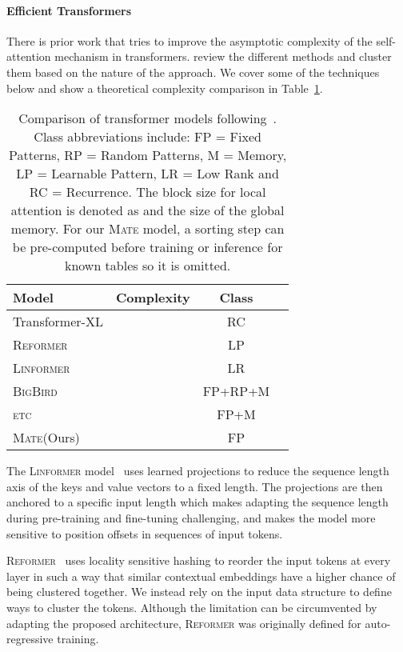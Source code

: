 \documentclass[11pt]{article}
\newcommand{\etc}{\textsc{etc}\xspace}
\newcommand{\bigbird}{\textsc{BigBird}\xspace}
\newcommand{\linformer}{\textsc{Linformer}\xspace}
\newcommand{\reformer}{\textsc{Reformer}\xspace}
\newcommand{\model}{\textsc{Mate}\xspace}
\begin{document}
\paragraph{Efficient Transformers}
There is prior work that tries to improve the asymptotic
complexity of the self-attention mechanism in transformers.
\citet{tay2020efficient} review the different methods and cluster them based
on the nature of the approach. We cover some of the techniques below and show a theoretical complexity comparison in Table~\ref{tab:complexity}.

\begin{table}[t]
    \centering
    \begin{tabular}{lccl}
    \hline
       Model  &  Complexity & Class\\
       \hline
         Transformer-XL
         &  & RC \\ 
        \reformer 
        &  & LP\\
           \linformer 
           &  & LR \\
        \bigbird 
        &  & FP+RP+M\\ 
        \etc 
        &  & FP+M\\ 
        \model (Ours) &  & FP\\ 
        \hline
    \end{tabular}
    \caption{Comparison of transformer models following~\citet{tay2020efficient}. Class abbreviations include: FP = Fixed Patterns, RP = Random Patterns, M = Memory, LP = Learnable Pattern, LR = Low Rank and RC = Recurrence. The block size for local attention is denoted as  and  the size of the global memory. For our \model model, a  sorting step can be pre-computed before training or inference for known tables so it is omitted.}
    \label{tab:complexity}
\end{table} 
The \linformer model~\citet{wang2020linformer} uses learned projections to reduce the sequence length
axis of the keys and value vectors to a fixed length. The projections are then
anchored to a specific input length which makes adapting the sequence length
during pre-training and fine-tuning challenging, and makes the model more sensitive to position offsets in sequences of input tokens.

\reformer ~\citep{kitaev2020reformer} uses locality sensitive hashing to reorder the input
tokens at every layer in such a way that similar contextual embeddings have
a higher chance of being clustered together. We instead rely on the input data structure to define ways to cluster the tokens.
Although the limitation can be circumvented by adapting the proposed architecture, \reformer was originally defined for
auto-regressive training.
\end{document}
